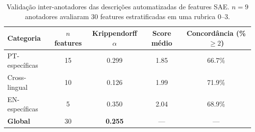\begin{table}[H]
\centering
\caption{Validação inter-anotadores das descrições automatizadas de features SAE. $n = 9$ anotadores avaliaram 30 features estratificadas em uma rubrica 0--3.}
\label{tab:iaa_multiannotator}
\begin{tabular}{l c c c c}
\toprule
\textbf{Categoria} & \textbf{$n$ features} & \textbf{Krippendorff $\alpha$} & \textbf{Score médio} & \textbf{Concordância (\% $\geq 2$)} \\
\midrule
PT-específicas & 15 & 0.299 & 1.85 & 66.7\% \\
Cross-lingual & 10 & 0.126 & 1.99 & 71.9\% \\
EN-específicas & 5 & 0.350 & 2.04 & 68.9\% \\
\midrule
\textbf{Global} & 30 & \textbf{0.255} & --- & --- \\
\bottomrule
\end{tabular}
\end{table}